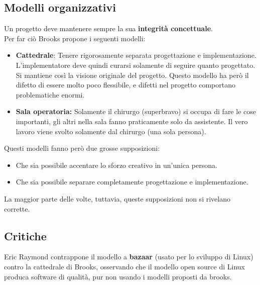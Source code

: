 \documentclass[a4paper,12pt]{article}
\begin{document}
\subsection{Modelli organizzativi}
Un progetto deve mantenere sempre la sua \textbf{integrità concettuale}.\\
Per far ciò Brooks propone i seguenti modelli:
\begin{itemize}
\item \textbf{Cattedrale}: Tenere rigorosamente separata progettazione e implementazione. L'implementatore deve quindi curarsi solamente di seguire quanto progettato. Si mantiene così la visione originale del progetto. Questo modello ha però il difetto di essere molto poco flessibile, e difetti nel progetto comportano problematiche enormi.
\item \textbf{Sala operatoria:} Solamente il chirurgo (superbravo) si occupa di fare le cose importanti, gli altri nella sala fanno praticamente solo da assistente. Il vero lavoro viene svolto solamente dal chirurgo (una sola persona).
\end{itemize}
Questi modelli fanno però due grosse supposizioni:
\begin{itemize}
\item Che sia possibile accentare lo sforzo creativo in un'unica persona.
\item Che sia possibile separare completamente progettazione e implementazione.
\end{itemize}
La maggior parte delle volte, tuttavia, queste supposizioni non si rivelano corrette.

\subsection{Critiche}
Eric Raymond contrappone il modello a \textbf{bazaar} (usato per lo sviluppo di Linux) contro la cattedrale di Brooks, osservando che il modello open source di Linux produca software di qualità, pur non usando i modelli proposti da brooks.
\end{document}
